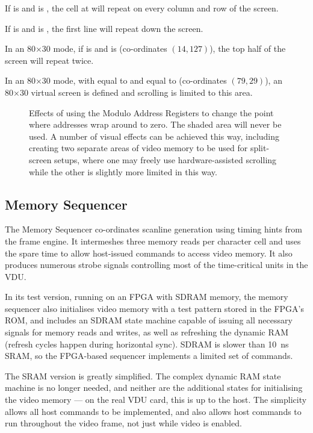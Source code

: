 If  is  and  is , the cell at
 will repeat on every column and row of the screen.

If  is  and  is , the first line will
repeat down the screen.

In an 80×30 mode, if  is  and  is 
(co-ordinates $(14,127)$), the top half of the screen will repeat twice.

In an 80×30 mode, with  equal to  and  equal to
 (co-ordinates $(79,29)$), an 80×30 virtual screen is defined and scrolling is limited to this
area.

\begin{figure}
 \centering
 \caption[Effects of the Modulo Address Register]{\label{fig:vdu-mar} Effects
   of using the Modulo Address Registers to change the point where addresses
   wrap around to zero. The shaded area will never be used. A number of visual
   effects can be achieved this way, including creating two separate areas of
   video memory to be used for split-screen setups, where one may freely use
   hardware-assisted scrolling while the other is slightly more limited in this
   way.}
\end{figure}


\subsection{Memory Sequencer}
\label{sec:vdu:memory-sequencer}

The Memory Sequencer co-ordinates scanline generation using timing hints from
the frame engine. It intermeshes three memory reads per character cell and uses
the spare time to allow host-issued commands to access video memory. It also
produces numerous strobe signals controlling most of the time-critical units in
the VDU.

In its test version, running on an FPGA with \gls{SDRAM} memory, the memory sequencer
also initialises video memory with a test pattern stored in the FPGA's ROM, and
includes an SDRAM state machine capable of issuing all necessary signals for
memory reads and writes, as well as refreshing the dynamic RAM (refresh cycles
happen during horizontal sync). SDRAM is slower than 10~ns SRAM, so the
FPGA-based sequencer implements a limited set of commands.

The \gls{SRAM} version is greatly simplified. The complex dynamic RAM state
machine is no longer needed, and neither are the additional states for
initialising the video memory — on the real VDU card, this is up to the
host. The simplicity allows all host commands to be implemented, and also
allows host commands to run throughout the video frame, not just while video is
enabled.


